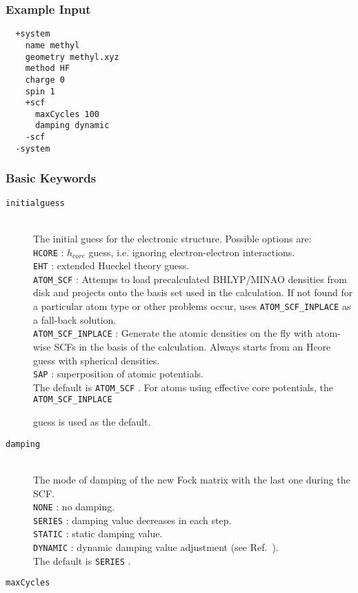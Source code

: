 \documentclass[bibliography=totocnumbered,a4paper,10pt,oneside]{scrbook}
\newcommand{\ttt}[1]{%
  \begingroup\setlength{\fboxsep}{1pt}%
  \colorbox{serenity-green!30}{\texttt{\hspace*{2pt}\vphantom{(g}#1\hspace*{2pt}}}%
  \endgroup
}
\begin{document}
\subsubsection{Example Input}
\begin{lstlisting}
  +system
    name methyl
    geometry methyl.xyz
    method HF
    charge 0
    spin 1
    +scf
      maxCycles 100
      damping dynamic
    -scf
  -system
 \end{lstlisting}
\subsubsection{Basic Keywords}
\begin{description}
 \item [\texttt{initialguess}]\hfill \\
   The initial guess for the electronic structure. Possible options are:\\
   \ttt{HCORE}: $h_{core}$ guess, i.e. ignoring electron-electron interactions.\\
   \ttt{EHT}: extended Hueckel theory guess.\\
   \ttt{ATOM\_SCF}: Attemps to load precalculated BHLYP/MINAO densities from disk and projects onto the basis set used in the calculation. If not found for a particular atom type
   or other problems occur, uses \ttt{ATOM\_SCF\_INPLACE} as a fall-back solution.\\
   \ttt{ATOM\_SCF\_INPLACE}: Generate the atomic densities on the fly with atom-wise SCFs in the basis of the calculation. Always starts from an Hcore guess with spherical densities.\\
   \ttt{SAP}: superposition of atomic potentials.\\
   The default is \ttt{ATOM\_SCF}. For atoms using effective core potentials, the \ttt{ATOM\_SCF\_INPLACE}
   guess is used as the default.
 \item [\texttt{damping}]\hfill \\
   The mode of damping of the new Fock matrix with the last one during the SCF.\\
   \ttt{NONE}: no damping.\\
   \ttt{SERIES}: damping value decreases in each step.\\
   \ttt{STATIC}: static damping value.\\
   \ttt{DYNAMIC}: dynamic damping value adjustment (see Ref.~\cite{cances2000can}).\\
   The default is \ttt{SERIES}.
   \item [\texttt{maxCycles}]\hfill \\

\end{description}
\end{document}
